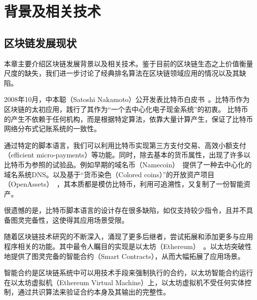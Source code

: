 
\section{背景及相关技术}




\subsection{区块链发展现状}
本章主要介绍区块链发展背景以及相关技术。鉴于目前的区块链生态之上价值衡量尺度的缺失，我们进一步讨论了经典排名算法在区块链领域应用的情况以及其缺陷。

2008年10月，中本聪（Satoshi Nakamoto）公开发表比特币白皮书~\cite{Nakamoto2008}。比特币作为区块链的太初应用，践行了其作为“一个去中心化电子现金系统”的初衷。 比特币的产生不依赖于任何机构，而是根据特定算法，依靠大量计算产生，保证了比特币网络分布式记账系统的一致性。

通过特定的脚本语言，我们可以利用比特币实现第三方支付交易、高效小额支付（efficient micro-payments）等功能。同时，除去基本的货币属性，出现了许多以比特币为参照的试验品。例如早期的域名币（Namecoin）~\cite{Namecoin}提供了一种去中心化的域名系统DNS。以及基于“货币染色（Colored coins）”的开放资产项目（OpenAssets）~\cite{OpenAssets}，其本质都是模仿比特币，利用可追溯性，又复制了一份智能资产。


很遗憾的是，比特币脚本语言的设计存在很多缺陷，如仅支持较少指令，且并不具备图灵完备性，这使得其应用场景受限。

随着区块链技术研究的不断深入，涌现了更多后继者，尝试拓展和添加更多与应用程序相关的功能。其中最令人瞩目的实现是以太坊（Ethereum）~\cite{buterin2013ethereum}。以太坊突破性地提供了图灵完备的智能合约（Smart Contracts），从而大幅拓展了应用场景。

智能合约是区块链系统中可以用技术手段来强制执行的合约，以太坊智能合约运行在以太坊虚拟机（Ethereum Virtual Machine）上，以太坊虚拟机不受任何实体控制，通过共识算法来验证合约本身及其输出的完整性。

